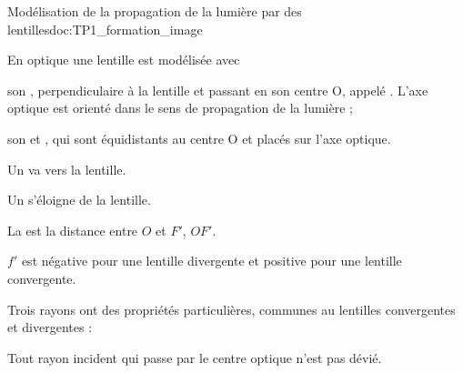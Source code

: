 \begin{doc}{Modélisation de la propagation de la lumière par des lentilles}{doc:TP1_formation_image}

  
  En optique une lentille est modélisée avec
  \begin{listePoints}
    \item son , perpendiculaire à la lentille et passant en son centre O, appelé . L'axe optique est orienté dans le sens de propagation de la lumière ;
    \item son  et , qui sont équidistants au centre O et placés sur l'axe optique.
  \end{listePoints}

  \begin{boite}
    \vspace{-4pt}
    \vspace{-8pt}
    \begin{encart}
      \begin{listePoints}
        \item Un  va vers la lentille.
        \item Un  s'éloigne de la lentille.
        \item La  est la distance entre $O$ et $F'$, $OF'$.
      \end{listePoints}
    \end{encart}
    \vspace{-4pt}
    
    $f'$ est négative pour une lentille divergente et positive pour une lentille convergente.
  \end{boite}    

  Trois rayons ont des propriétés particulières, communes au lentilles convergentes et divergentes :
  
  \begin{listePoints}
    \item Tout rayon incident qui passe par le centre optique n'est pas dévié.
    \begin{center}
    \end{center}
  

\end{listePoints}
\end{doc}
